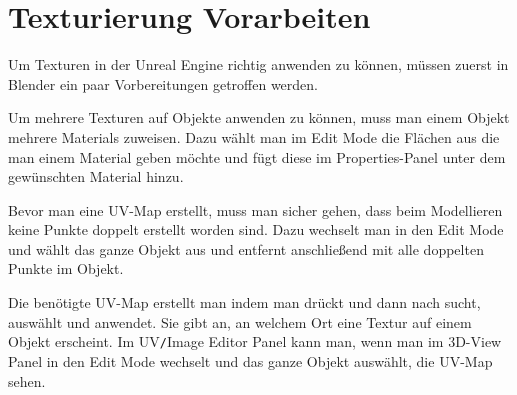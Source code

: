 \section{Texturierung Vorarbeiten}
Um Texturen in der Unreal Engine richtig anwenden zu können, müssen zuerst in Blender ein paar Vorbereitungen getroffen werden.

Um mehrere Texturen auf Objekte anwenden zu können, muss man einem Objekt mehrere Materials zuweisen. Dazu wählt man im Edit Mode die Flächen aus die man einem Material geben
möchte und fügt diese im Properties-Panel unter  dem gewünschten Material hinzu.

Bevor man eine UV-Map erstellt, muss man sicher gehen, dass beim Modellieren keine Punkte
doppelt erstellt worden sind. Dazu wechselt man in den Edit Mode und wählt das ganze Objekt aus und entfernt anschließend mit  
alle doppelten Punkte im Objekt.

Die benötigte UV-Map erstellt man indem man \keys{\SPACE} drückt und dann nach  sucht, auswählt und anwendet. Sie gibt an, an welchem Ort
eine Textur auf einem Objekt erscheint. Im UV\verb-/-Image Editor Panel kann man, wenn man im 3D-View Panel in den Edit Mode
wechselt und das ganze Objekt auswählt, die UV-Map sehen.
